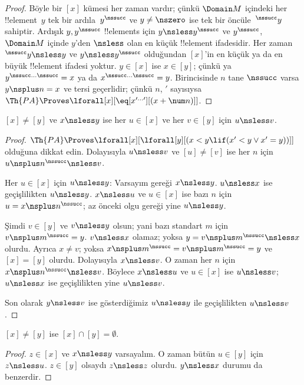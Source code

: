 \documentclass[../../../include/open-logic-section]{subfiles}
\begin{document}
\begin{proof}
Böyle bir $[x]$ kümesi her zaman vardır; çünkü $\Domain M$ içindeki
her !!{element}~$y$ tek bir ardıla~$y^\nssucc$ ve $y\neq\nszero$ ise
tek bir öncüle~$^\nssucc y$ sahiptir. Ardışık $y,y^\nssucc$
!!{element}s için $y\nsless y^\nssucc$ ve $y^\nssucc$, $\Domain M$
içinde $y$'den $\nsless$ olan en küçük !!{element} ifadesidir.
Her zaman $^\nssucc y\nsless y$ ve $y\nsless y^\nssucc$ olduğundan
$[x]$'in en küçük ya da en büyük !!{element} ifadesi yoktur.
$y\in[x]$ ise $x\in[y]$; çünkü ya
$y^{\nssucc\dots\nssucc}=x$ ya da
$x^{\nssucc\dots\nssucc}=y$. Birincisinde $n$ tane $\nssucc$ varsa
$y\nsplus n=x$ ve tersi geçerlidir; çünkü $n$, $\prime$ sayısıysa
$\Th{PA}\Proves\lforall[x][\eq[x^{\prime\dots\prime}][(x+\num n)]]$.
\end{proof}

\begin{prop}
$[x]\neq[y]$ ve $x\nsless y$ ise her $u\in[x]$ ve her $v\in[y]$ için
$u\nsless v$.
\end{prop}

\begin{proof}
$\Th{PA}\Proves\lforall[x][\lforall[y][(x<y\lif(x'<y\lor x'=y))]]$
olduğuna dikkat edin. Dolayısıyla $u\nsless v$ ve $[u]\neq[v]$ ise
her $n$ için $u\nsplus n^\nssucc\nsless v$.

Her $u\in[x]$ için $u\nsless y$: Varsayım gereği $x\nsless y$.
$u\nsless x$ ise geçişlilikten $u\nsless y$. $x\nsless u$ ve
$u\in[x]$ ise bazı $n$ için $u=x\nsplus n^\nssucc$; az önceki olgu
gereği yine $u\nsless y$.

Şimdi $v\in[y]$ ve $v\nsless y$ olsun; yani bazı standart $m$ için
$v\nsplus m^\nssucc=y$. $v\nsless x$ olamaz; yoksa
$y=v\nsplus m^\nssucc\nsless x$ olurdu. Ayrıca $x\neq v$; yoksa
$x\nsplus m^\nssucc=v\nsplus m^\nssucc=y$ ve $[x]=[y]$ olurdu.
Dolayısıyla $x\nsless v$. O zaman her $n$ için
$x\nsplus n^\nssucc\nsless v$. Böylece $x\nsless u$ ve $u\in[x]$
ise $u\nsless v$; $u\nsless x$ ise geçişlilikten yine $u\nsless v$.

Son olarak $y\nsless v$ ise gösterdiğimiz $u\nsless y$ ile
geçişlilikten $u\nsless v$.
\end{proof}

\begin{cor}
$[x]\neq[y]$ ise $[x]\cap[y]=\emptyset$.
\end{cor}

\begin{proof}
$z\in[x]$ ve $x\nsless y$ varsayalım. O zaman bütün $u\in[y]$ için
$z\nsless u$. $z\in[y]$ olsaydı $z\nsless z$ olurdu. $y\nsless x$
durumu da benzerdir.
\end{proof}
\end{document}
